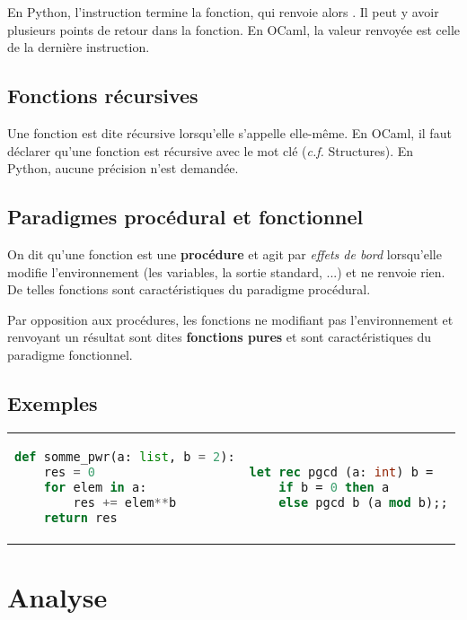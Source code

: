 \documentclass{hibiscus}
\begin{document}
\par En Python, l'instruction  termine la fonction, qui renvoie alors . Il peut y avoir plusieurs points de retour dans la fonction. En OCaml, la valeur renvoyée est celle de la dernière instruction.

\subsection{Fonctions récursives}

\par Une fonction est dite récursive lorsqu'elle s'appelle elle-même. En OCaml, il faut déclarer qu'une fonction est récursive avec le mot clé  (\textit{c.f.} Structures). En Python, aucune précision n'est demandée.

\subsection{Paradigmes procédural et fonctionnel}

\par On dit qu'une fonction est une \textbf{procédure} et agit par \textit{effets de bord} lorsqu'elle modifie l'environnement (les variables, la sortie standard, ...) et ne renvoie rien. De telles fonctions sont caractéristiques du paradigme procédural.

\medskip \par Par opposition aux procédures, les fonctions ne modifiant pas l'environnement et renvoyant un résultat sont dites \textbf{fonctions pures} et sont caractéristiques du paradigme fonctionnel.

\subsection{Exemples}

\begin{tabular}{p{} p{}}
\begin{lstlisting}[language=Python]
def somme_pwr(a: list, b = 2):
    res = 0
    for elem in a:
        res += elem**b
    return res
\end{lstlisting}
&
\begin{lstlisting}[language=Caml]
let rec pgcd (a: int) b =
    if b = 0 then a
    else pgcd b (a mod b);;
\end{lstlisting}
\end{tabular}


\newpage \section{Analyse}
\end{document}
